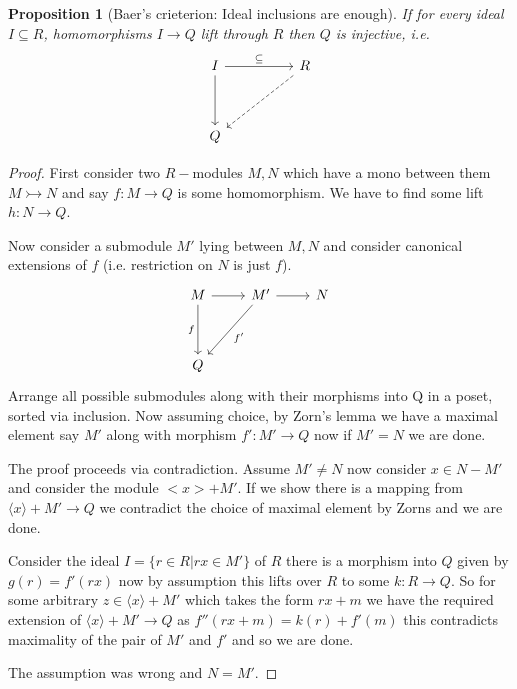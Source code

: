 \documentclass[12pt]{article}
\numberwithin{equation}{section}
\newtheorem{proposition}{Proposition}[section]
\begin{document}
	\begin{proposition}[Baer's crieterion: Ideal inclusions are enough]
		If for every ideal $I \subseteq R$, homomorphisms $I \to Q$ lift through $R$ then $Q$ is injective, i.e.
		\[\begin{tikzcd}
			I && R \\
			\\
			Q
			\arrow["\subseteq", from=1-1, to=1-3]
			\arrow["", from=1-1, to=3-1]
			\arrow[dashed, from=1-3, to=3-1]
		\end{tikzcd}\]
	\end{proposition}
	\begin{proof}
		First consider two $R-$modules $M,N$ which have a mono between them $M \rightarrowtail N $ and say $f: M \to Q$ is some homomorphism. We have to find some lift $h: N \to Q$.
		
		Now consider a submodule $M'$ lying between $M,N$ and consider canonical extensions of $f$ (i.e. restriction on $N$ is just $f$). 
		\[\begin{tikzcd}
			M & {M'} & N \\
			\\
			Q
			\arrow[from=1-1, to=1-2]
			\arrow[from=1-2, to=1-3]
			\arrow["f"', from=1-1, to=3-1]
			\arrow["{f'}", from=1-2, to=3-1]
		\end{tikzcd}\]
		Arrange all possible submodules along with their morphisms into Q in a poset, sorted via inclusion. Now assuming choice, by Zorn's lemma we have a maximal element say $M'$ along with morphism $f': M' \to Q$ now if $M'=N$ we are done. 
		
		The proof proceeds via contradiction. Assume $M'\neq N$ now consider $x \in N-M'$ and consider the module $<x>+M'$. If we show there is a mapping from $\langle x \rangle+M' \to Q$ we contradict the choice of maximal element by Zorns and we are done.
		
		Consider the ideal $I=\{r \in R | rx \in M'\}$ of $R$ there is a morphism into $Q$ given by $g(r)=f'(rx)$ now by assumption this lifts over $R$ to some $k: R \to Q$. So for some arbitrary $z\in \langle x \rangle+M'$ which takes the form $rx+m$ we have the required extension of $\langle x \rangle+ M' \to Q$ as $f''(rx+m)=k(r)+f'(m)$ this contradicts maximality of the pair of $M'$ and $f'$ and so we are done.
		
		The assumption was wrong and $N=M'$.
		
	\end{proof}
	
	
	
\end{document}
